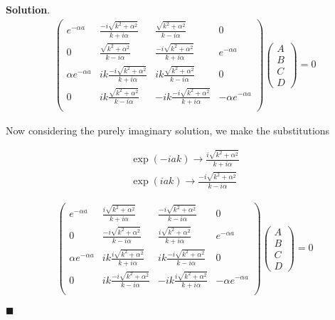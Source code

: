 \documentclass[12pt]{article}
\theoremstyle{definition}
\newenvironment{s}{%
        \begin{trivlist} \item \textbf{Solution}. }{%
            \hspace*{\fill} $\blacksquare$\end{trivlist}}%
\begin{document}
{\begin{s}
\begin{align*}
\begin{pmatrix}
e^{-\alpha a} & \frac{-i\sqrt{k^{2} + \alpha^{2}}}{k+i\alpha} & \frac{\sqrt{k^{2} + \alpha^{2}}}{k-i\alpha} & 0\\
0 & \frac{\sqrt{k^{2} + \alpha^{2}}}{k-i\alpha} & \frac{-i\sqrt{k^{2} + \alpha^{2}}}{k+i\alpha} & e^{-\alpha a}\\
\alpha e^{-\alpha a} & ik\frac{-i\sqrt{k^{2} + \alpha^{2}}}{k+i\alpha} & ik\frac{\sqrt{k^{2} + \alpha^{2}}}{k-i\alpha} & 0\\
0 & ik\frac{\sqrt{k^{2} + \alpha^{2}}}{k-i\alpha} & -ik\frac{-i\sqrt{k^{2} + \alpha^{2}}}{k+i\alpha} & -\alpha e^{-\alpha a}\\
\end{pmatrix}\begin{pmatrix}A\\B\\C\\D\end{pmatrix} = 0
\end{align*}

Now considering the purely imaginary solution, we make the substitutions

\begin{align*}
\exp(-iak) \rightarrow \frac{i\sqrt{k^{2} + \alpha^{2}}}{k+i\alpha}\\
\exp(iak) \rightarrow \frac{-i\sqrt{k^{2} + \alpha^{2}}}{k-i\alpha}
\end{align*}

\begin{align*}
\begin{pmatrix}
e^{-\alpha a} & \frac{i\sqrt{k^{2} + \alpha^{2}}}{k+i\alpha} & \frac{-i\sqrt{k^{2} + \alpha^{2}}}{k-i\alpha} & 0\\
0 & \frac{-i\sqrt{k^{2} + \alpha^{2}}}{k-i\alpha} & \frac{i\sqrt{k^{2} + \alpha^{2}}}{k+i\alpha} & e^{-\alpha a}\\
\alpha e^{-\alpha a} & ik\frac{i\sqrt{k^{2} + \alpha^{2}}}{k+i\alpha} & ik\frac{-i\sqrt{k^{2} + \alpha^{2}}}{k-i\alpha} & 0\\
0 & ik\frac{-i\sqrt{k^{2} + \alpha^{2}}}{k-i\alpha} & -ik\frac{i\sqrt{k^{2} + \alpha^{2}}}{k+i\alpha} & -\alpha e^{-\alpha a}\\
\end{pmatrix}\begin{pmatrix}A\\B\\C\\D\end{pmatrix} = 0
\end{align*}


\end{s}
\end{document}
